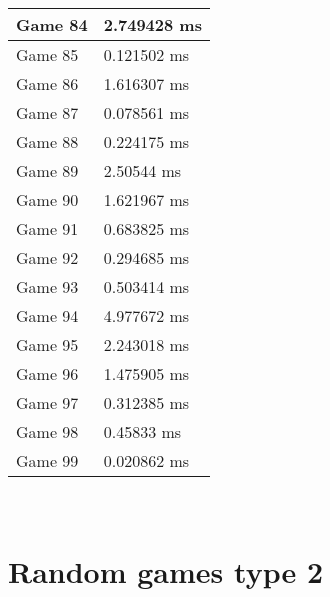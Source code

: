 \begin{multicols}{2}
\begin{tabular}{|l|l|}
	Game 84 & 2.749428 ms \\ \hline
	Game 85 & 0.121502 ms \\ \hline
	Game 86 & 1.616307 ms \\ \hline
	Game 87 & 0.078561 ms \\ \hline
	Game 88 & 0.224175 ms \\ \hline
	Game 89 & 2.50544 ms \\ \hline
	Game 90 & 1.621967 ms \\ \hline
	Game 91 & 0.683825 ms \\ \hline
	Game 92 & 0.294685 ms \\ \hline
	Game 93 & 0.503414 ms \\ \hline
	Game 94 & 4.977672 ms \\ \hline
	Game 95 & 2.243018 ms \\ \hline
	Game 96 & 1.475905 ms \\ \hline
	Game 97 & 0.312385 ms \\ \hline
	Game 98 & 0.45833 ms \\ \hline
	Game 99 & 0.020862 ms \\ \hline
\end{tabular}\\
\end{multicols}\pagebreak\section{Random games type 2}
